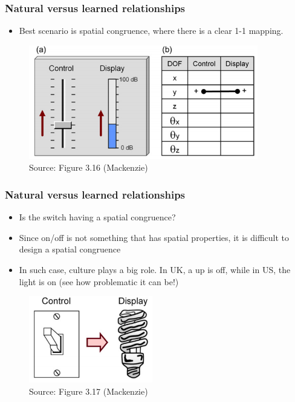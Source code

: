 \documentclass{beamer}
\begin{document}
\begin{frame}
	\frametitle{Natural versus learned relationships}
	\begin{itemize}
		\item Best scenario is spatial congruence, where there is a clear 1-1 mapping.
	\end{itemize}
	\begin{figure}
		\includegraphics[width=0.7\linewidth]{image/3-16}
		\caption{Source: Figure 3.16 (Mackenzie)}
	\end{figure}
\end{frame}

\begin{frame}
	\frametitle{Natural versus learned relationships}
	\begin{itemize}
		\item Is the switch having a spatial congruence?
		\item Since on/off is not something that has spatial properties, it is difficult to design a spatial congruence
		\item In such case, culture plays a big role.  In UK, a up is off, while in US, the light is on (see how problematic it can be!)
	\end{itemize}
	\begin{figure}
		\includegraphics[width=0.4\linewidth]{image/3-17}
		\caption{Source: Figure 3.17 (Mackenzie)}
	\end{figure}
\end{frame}
\end{document}
